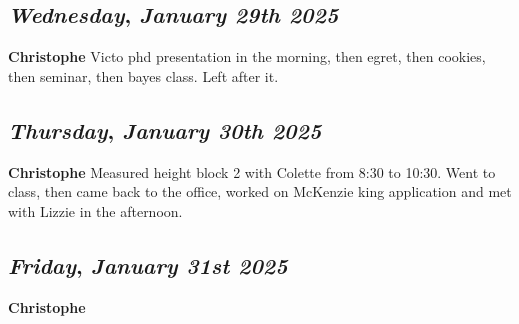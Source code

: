 \def\day{\textit{January 29th 2025}}
\def\weekday{\textit{Wednesday}}
\subsection*{\weekday, \day}
\textbf {Christophe}
Victo phd presentation in the morning, then egret, then cookies, then seminar, then bayes class. Left after it. 

\def\day{\textit{January 30th 2025}}
\def\weekday{\textit{Thursday}}
\subsection*{\weekday, \day}
\textbf {Christophe}
Measured height block 2 with Colette from 8:30 to 10:30. Went to class, then came back to the office, worked on McKenzie king application and met with Lizzie in the afternoon. 

\def\day{\textit{January 31st 2025}}
\def\weekday{\textit{Friday}}
\subsection*{\weekday, \day}
\textbf {Christophe}
